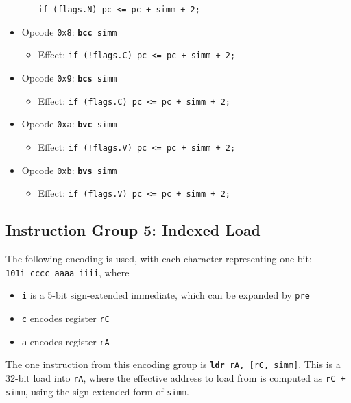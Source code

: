 \documentclass{article}
\begin{document}
\begin{itemize}
\begin{itemize}
				\texttt{if (flags.N) pc <= pc + simm + 2;}
		\end{itemize}
		\item Opcode \texttt{0x8}:
			\texttt{\textbf{bcc} simm}
		\begin{itemize}
			\item Effect:
				\texttt{if (!flags.C) pc <= pc + simm + 2;}
		\end{itemize}
		\item Opcode \texttt{0x9}:
			\texttt{\textbf{bcs} simm}
		\begin{itemize}
			\item Effect:
				\texttt{if (flags.C) pc <= pc + simm + 2;}
		\end{itemize}
		\item Opcode \texttt{0xa}:
			\texttt{\textbf{bvc} simm}
		\begin{itemize}
			\item Effect:
				\texttt{if (!flags.V) pc <= pc + simm + 2;}
		\end{itemize}
		\item Opcode \texttt{0xb}:
			\texttt{\textbf{bvs} simm}
		\begin{itemize}
			\item Effect:
				\texttt{if (flags.V) pc <= pc + simm + 2;}
		\end{itemize}
	\end{itemize}

	\doublespacing
	\subsection{Instruction Group 5:  Indexed Load}
	The following encoding is used, with each character representing one
	bit:  \\
	\texttt{101i cccc aaaa iiii}, where

	\singlespacing
	\begin{itemize}
		\item \texttt{i} is a 5-bit sign-extended immediate, which can
		be expanded by \texttt{pre}  
		\item \texttt{c} encodes register \texttt{rC}
		\item \texttt{a} encodes register \texttt{rA}
	\end{itemize}
	\doublespacing

	The one instruction from this encoding group is
	\texttt{\textbf{ldr} rA, [rC, simm]}.
	This is a 32-bit load into \texttt{rA}, where the effective address to
	load from is computed as \texttt{rC + simm}, using the sign-extended
	form of \texttt{simm}.
\end{document}
